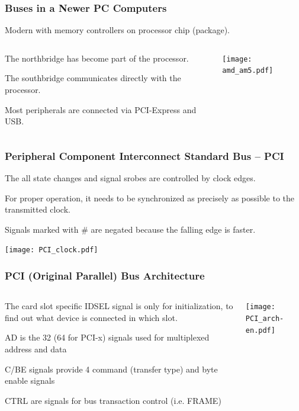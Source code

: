 \documentclass{beamer}
\begin{document}
\begin{frame}
\frametitle{Buses in a Newer PC Computers}

\begin{center}
Modern with memory controllers on processor chip (package).
\end{center}

\begin{columns}
\begin{column}{0.4\textwidth}
The northbridge has become part of the processor.

\bigskip
The southbridge communicates directly with the processor.

\bigskip
Most peripherals are connected via PCI-Express and USB.
\end{column}
\begin{column}{0.6\textwidth}
\texttt{[image: amd\_am5.pdf]}
\end{column}
\end{columns}
\end{frame}


\begin{frame}
\frametitle{Peripheral Component Interconnect Standard Bus -- PCI}

The all state changes and signal srobes are controlled by clock edges.

For proper operation, it needs to be synchronized as precisely as possible to the transmitted clock.

Signals marked with \# are negated because the falling edge is faster.

\begin{center}
\texttt{[image: PCI\_clock.pdf]}
\end{center}
\end{frame}

\begin{frame}
\frametitle{PCI (Original Parallel) Bus Architecture}

\begin{columns}
\begin{column}{0.35\textwidth}
The card slot specific IDSEL signal is only for initialization, to find out what device is connected in which slot.

\medskip
AD is the 32 (64 for PCI-x) signals used for multiplexed address and data

\medskip
C/BE signals provide 4 command (transfer type) and byte enable signals

\medskip
CTRL are signals for bus transaction control (i.e. FRAME)
\end{column}
\begin{column}{0.6\textwidth}
\texttt{[image: PCI\_arch-en.pdf]}
\end{column}
\end{columns}

\end{frame}
\end{document}
